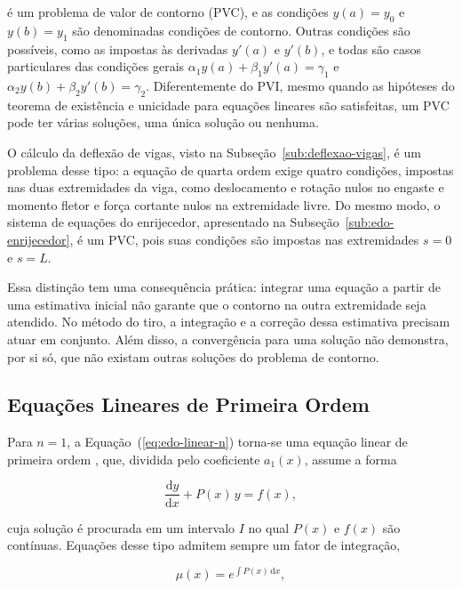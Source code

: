 \documentclass[arial,centeredequations,english,brazilian,oneside,section=TITLE]{ifes8}
\begin{document}
é um problema de valor de contorno (PVC), e as condições $y(a) = y_0$ e $y(b) = y_1$
são denominadas condições de contorno. Outras condições são
possíveis, como as impostas às derivadas $y'(a)$ e $y'(b)$, e todas são casos
particulares das condições gerais $\alpha_1 y(a) + \beta_1 y'(a) = \gamma_1$ e
$\alpha_2 y(b) + \beta_2 y'(b) = \gamma_2$. Diferentemente
do PVI, mesmo quando as hipóteses do teorema de existência e unicidade para equações
lineares são satisfeitas, um PVC pode ter várias soluções, uma única solução ou nenhuma.
 
O cálculo da deflexão de vigas, visto na Subseção~\ref{sub:deflexao-vigas}, é um
problema desse tipo: a equação de quarta ordem exige quatro condições, impostas nas duas
extremidades da viga, como deslocamento e rotação nulos no engaste e momento fletor e
força cortante nulos na extremidade livre. Do mesmo modo, o sistema de equações do
enrijecedor, apresentado na Subseção~\ref{sub:edo-enrijecedor}, é um PVC, pois suas
condições são impostas nas extremidades $s = 0$ e $s = L$.

Essa distinção tem uma consequência prática: integrar uma equação a partir de
uma estimativa inicial não garante que o contorno na outra extremidade seja
atendido. No método do tiro, a integração e a correção dessa estimativa precisam
atuar em conjunto. Além disso, a convergência para uma solução não demonstra,
por si só, que não existam outras soluções do problema de contorno.
 
\subsection{Equações Lineares de Primeira Ordem}
\label{sub:edo-linear-1}
 
Para $n = 1$, a Equação~(\ref{eq:edo-linear-n}) torna-se uma equação linear de primeira
ordem \cite{Zill2001v2}, que, dividida pelo coeficiente $a_1(x)$, assume a forma

\begin{equation}
  \label{eq:linear-1}
  \frac{\mathrm{d}y}{\mathrm{d}x} + P(x)\,y = f(x),
\end{equation}

cuja solução é procurada em um intervalo $I$ no qual $P(x)$ e $f(x)$ são contínuas.
Equações desse tipo admitem sempre um fator de integração,

\begin{equation}
  \label{eq:fator-integracao}
  \mu(x) = e^{\int P(x)\,\mathrm{d}x},
\end{equation}
\end{document}
